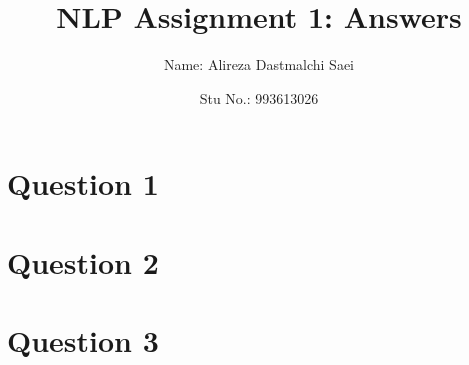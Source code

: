 \documentclass{article}
\title{\textbf{\Huge NLP Assignment 1: Answers}}
\author{Name: Alireza Dastmalchi Saei}
\date{Stu No.: 993613026}
\begin{document}
\maketitle

\pagebreak

\section{Question 1}

\pagebreak

\section{Question 2}

\pagebreak

\section{Question 3}
\end{document}
